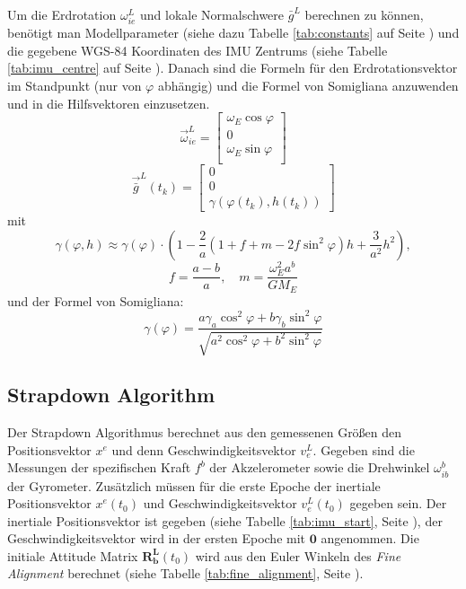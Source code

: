 Um die Erdrotation $\omega_{ie}^L$ und lokale Normalschwere $\bar{g}^L$ berechnen zu können, benötigt man Modellparameter (siehe dazu Tabelle \ref{tab:constants} auf Seite \pageref{tab:constants}) und die gegebene WGS-84 Koordinaten des IMU Zentrums (siehe Tabelle \ref{tab:imu_centre} auf Seite \pageref{tab:imu_centre}). Danach sind die Formeln für den Erdrotationsvektor im Standpunkt (nur von $\varphi$ abhängig) und die Formel von Somigliana anzuwenden und in die Hilfsvektoren einzusetzen.
\begin{equation}
 	\vec{\omega}_{ie}^L =
		\begin{bmatrix}
			   \omega_E \cos{\varphi}\\
                	   0\\
                	   \omega_E \sin{\varphi}\\
		\end{bmatrix}
\end{equation}
\begin{equation}\label{eq:g_L}
 	\vec{\bar{g}}^L(t_k) = 
		\begin{bmatrix}
			0\\
			0\\
			\gamma(\varphi (t_k), h(t_k))
		\end{bmatrix}
\end{equation}
mit
\begin{equation}
 	\gamma (\varphi, h) \approx \gamma(\varphi) \cdot \left ( 1 -\frac{2}{a} \left ( 1+f+m-2f\sin^2{\varphi}\right) h +\frac{3}{a^2}h^2 \right),
\end{equation}
\begin{equation}
 	f = \frac{a-b}{a} ,\quad m = \frac{\omega_E^2a^b}{GM_E}
\end{equation}
und der Formel von Somigliana:
\begin{equation}\label{eq:somigliana}
 	\gamma (\varphi) = \frac{a \gamma_a \cos^2{\varphi} + b \gamma_b \sin^2{\varphi}}{\sqrt{a^2 \cos^2{\varphi} + b^2 \sin^2{\varphi}}}
\end{equation}

\subsection{Strapdown Algorithm}

Der Strapdown Algorithmus berechnet aus den gemessenen Größen den Positionsvektor $x^e$ und denn Geschwindigkeitsvektor $v_e^L$. Gegeben sind die Messungen der spezifischen Kraft $f^b$ der Akzelerometer sowie die Drehwinkel $\omega_{ib}^b$ der Gyrometer. Zusätzlich müssen für die erste Epoche der inertiale Positionsvektor $x^e(t_0)$ und Geschwindigkeitsvektor $v_e^L(t_0)$ gegeben sein. Der inertiale Positionsvektor ist gegeben (siehe Tabelle \ref{tab:imu_start}, Seite \pageref{tab:imu_start}), der Geschwindigkeitsvektor wird in der ersten Epoche mit $\mathbf{0}$ angenommen. Die initiale Attitude Matrix $\mathbf{R_b^L}(t_0)$ wird aus den Euler Winkeln des \textit{Fine Alignment} berechnet (siehe Tabelle \ref{tab:fine_alignment}, Seite \pageref{tab:fine_alignment}).

